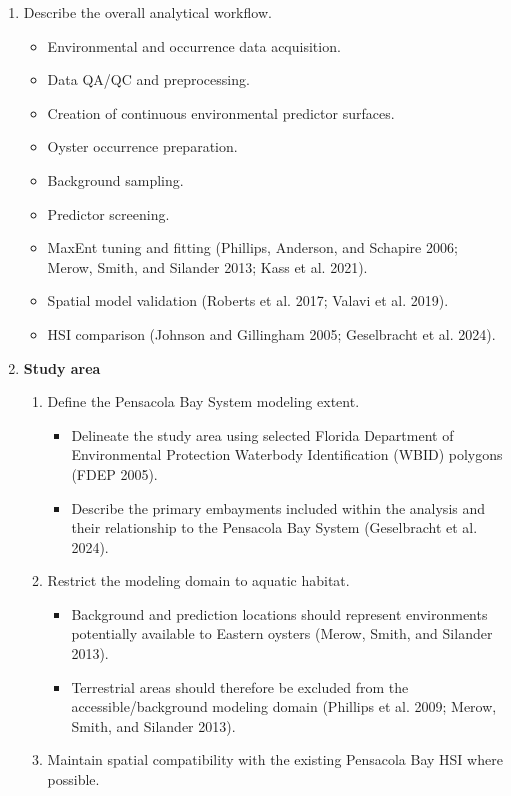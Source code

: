 \documentclass[
  letterpaper,
  DIV=11,
  numbers=noendperiod]{scrartcl}
\providecommand{\tightlist}{%
  \setlength{\itemsep}{0pt}\setlength{\parskip}{0pt}}
\begin{document}
\begin{enumerate}
\def\labelenumi{\arabic{enumi}.}
\setcounter{enumi}{1}
\item
  Describe the overall analytical workflow.

  \begin{itemize}
  \tightlist
  \item
    Environmental and occurrence data acquisition.
  \item
    Data QA/QC and preprocessing.
  \item
    Creation of continuous environmental predictor surfaces.
  \item
    Oyster occurrence preparation.
  \item
    Background sampling.
  \item
    Predictor screening.
  \item
    MaxEnt tuning and fitting (Phillips, Anderson, and Schapire 2006;
    Merow, Smith, and Silander 2013; Kass et al. 2021).
  \item
    Spatial model validation (Roberts et al. 2017; Valavi et al. 2019).
  \item
    HSI comparison (Johnson and Gillingham 2005; Geselbracht et al.
    2024).
  \end{itemize}
\item
  \textbf{Study area}

  \begin{enumerate}
  \def\labelenumii{\arabic{enumii}.}
  \tightlist
  \item
    Define the Pensacola Bay System modeling extent.

    \begin{itemize}
    \tightlist
    \item
      Delineate the study area using selected Florida Department of
      Environmental Protection Waterbody Identification (WBID) polygons
      (FDEP 2005).
    \item
      Describe the primary embayments included within the analysis and
      their relationship to the Pensacola Bay System (Geselbracht et al.
      2024).
    \end{itemize}
  \item
    Restrict the modeling domain to aquatic habitat.

    \begin{itemize}
    \tightlist
    \item
      Background and prediction locations should represent environments
      potentially available to Eastern oysters (Merow, Smith, and
      Silander 2013).
    \item
      Terrestrial areas should therefore be excluded from the
      accessible/background modeling domain (Phillips et al. 2009;
      Merow, Smith, and Silander 2013).
    \end{itemize}
  \item
    Maintain spatial compatibility with the existing Pensacola Bay HSI
    where possible.


\end{enumerate}
\end{enumerate}
\end{document}
